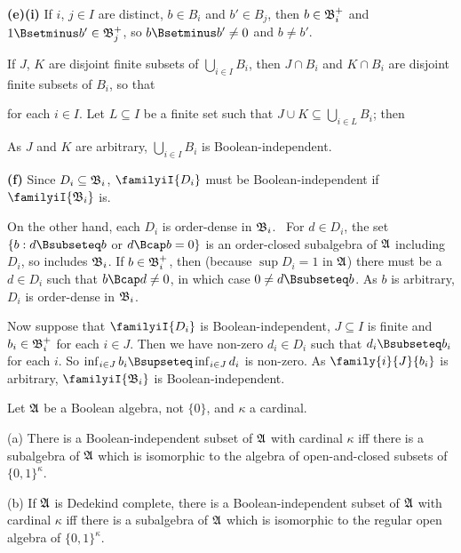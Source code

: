 {\medskip

{\bf (e)(i)} If $i$, $j\in I$ are distinct, $b\in B_i$ and $b'\in B_j$,
then $b\in\frak B_i^+$ and
$1\Bsetminus b'\in\frak B_j^+$, so $b\Bsetminus b'\ne 0$ and
$b\ne b'$.

\medskip

 If $J$, $K$ are disjoint finite subsets of
$\bigcup_{i\in I}B_i$, then $J\cap B_i$ and $K\cap B_i$ are disjoint
finite subsets of $B_i$, so that


\noindent for each $i\in I$.   Let $L\subseteq I$ be a finite set such
that $J\cup K\subseteq\bigcup_{i\in L}B_i$;  then


\noindent As $J$ and $K$ are arbitrary, $\bigcup_{i\in I}B_i$ is
Boolean-independent.

\medskip

{\bf (f)} Since $D_i\subseteq\frak B_i$, $\familyiI{D_i}$ must be
Boolean-independent if $\familyiI{\frak B_i}$ is.

On the other hand, each $D_i$ is order-dense in $\frak B_i$.   \Prf\ For
$d\in D_i$, the set $\{b:d\Bsubseteq b$ or $d\Bcap b=0\}$ is an
order-closed subalgebra of $\frak A$ including $D_i$, so includes
$\frak B_i$.
If  $b\in\frak B_i^+$, then (because $\sup D_i=1$ in $\frak A$) there
must be a $d\in D_i$ such that $b\Bcap d\ne 0$, in which case
$0\ne d\Bsubseteq b$.   As $b$ is arbitrary, $D_i$ is order-dense in
$\frak B_i$.\ \Qed

Now suppose that $\familyiI{D_i}$ is Boolean-independent, $J\subseteq I$
is finite and $b_i\in\frak B_i^+$ for each $i\in J$.   Then we have
non-zero $d_i\in D_i$ such that $d_i\Bsubseteq b_i$ for each $i$.   So
$\inf_{i\in J}b_i\Bsupseteq\inf_{i\in J}d_i$ is non-zero.   As
$\family{i}{J}{b_i}$ is arbitrary, $\familyiI{\frak B_i}$ is
Boolean-independent.
}%

 Let $\frak A$ be a Boolean algebra, not
$\{0\}$, and $\kappa$ a cardinal.

(a) There is a Boolean-independent subset of $\frak A$ with cardinal
$\kappa$ iff there is a subalgebra of $\frak A$ which is isomorphic to
the algebra of open-and-closed subsets of $\{0,1\}^{\kappa}$.

(b) If $\frak A$ is Dedekind complete,
there is a Boolean-independent subset of $\frak A$ with cardinal
$\kappa$ iff there is a subalgebra of $\frak A$ which is isomorphic to
the regular open algebra of $\{0,1\}^{\kappa}$.

